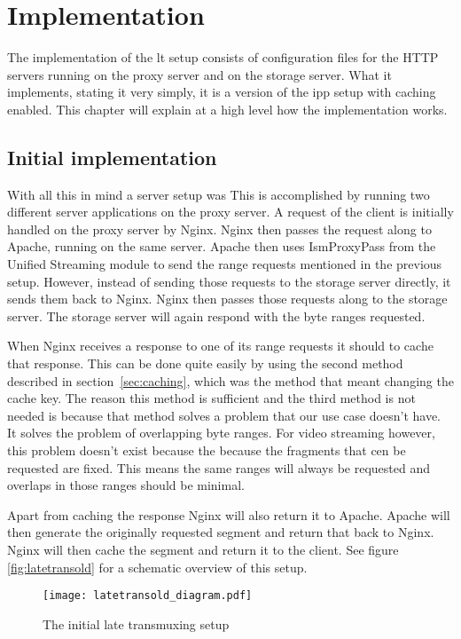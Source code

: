 \documentclass[twoside,openright]{uva-bachelor-thesis}
\begin{document}
\chapter{Implementation}
The implementation of the \gls{lt} setup consists of configuration files for the
HTTP servers running on the proxy server and on the storage server. What it
implements, stating it very simply, it is a version of the \gls{ipp} setup
with caching enabled. This chapter will explain at a high level how the
implementation works.

\section{Initial implementation}
With all this in mind a server setup was
This is accomplished by running two different server applications on
the proxy server. A request of the client is initially handled on the proxy
server by Nginx. Nginx then passes the request along to Apache, running on the
same server. Apache then uses IsmProxyPass from the Unified Streaming module to
send the range requests mentioned in the previous setup.  However,
instead of sending those requests to the storage server directly, it sends them
back to Nginx. Nginx then passes those requests along to the storage server. The
storage server will again respond with the byte ranges requested.

When Nginx receives a response to one of its range requests it should to cache
that response. This can be done quite easily by using the second method
described in section~\vref{sec:caching}, which was the method that meant
changing the cache key. The reason this method is sufficient and the third
method is not needed is because that method solves a problem that our use case
doesn't have.  It solves the problem of overlapping byte ranges. For video
streaming however, this problem doesn't exist because the because the fragments
that cen be requested are fixed. This means the same ranges will always be
requested and overlaps in those ranges should be minimal.

Apart from caching the response Nginx will also return it to Apache. Apache will
then generate the originally requested segment and return that back to Nginx.
Nginx will then cache the segment and return it to the client. See figure
\vref{fig:latetransold} for a schematic overview of this setup.

\begin{figure}
    \texttt{[image: latetransold\_diagram.pdf]}
    \caption{The initial late transmuxing setup}\label{fig:latetransold}
\end{figure}
\end{document}
